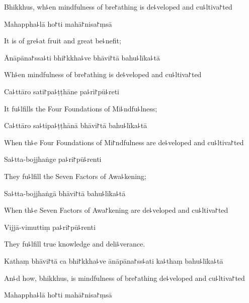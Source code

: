 \begin{english}
  Bhikkhus, wh꜕en mindfulness of bre꜓athing is de꜕veloped and cu꜕ltiva꜓ted
\end{english}

Mahappha꜕lā ho꜓ti mahā꜓nisa꜓ṃsā

\begin{english}
  It is of gre꜕at fruit and great be꜕nefit;
\end{english}

Ānāpāna꜓ssa꜕ti bhi꜓kkha꜕ve bhāvi꜓tā bahu꜕līka꜕tā

\begin{english}
  Wh꜕en mindfulness of bre꜓athing is de꜕veloped and cu꜕ltiva꜓ted
\end{english}

Ca꜕ttāro sati꜓pa꜕ṭṭhāne pa꜕ri꜓pū꜕reti

\begin{english}
  It fu꜕lfills the Four Foundations of Mi꜕ndfu꜕lness;
\end{english}

Ca꜕ttāro sa꜕tipa꜕ṭṭhānā bhāvi꜓tā bahu꜕līka꜕tā

\begin{english}
  When th꜕e Four Foundations of Mi꜓ndfulness are de꜕veloped and cu꜕ltiva꜓ted
\end{english}

Sa꜕tta-bojjhaṅge pa꜕ri꜓pū꜕renti

\begin{english}
  They fu꜕lfill the Seven Factors of Awa꜕kening;
\end{english}

Sa꜕tta-bojjhaṅgā bhāvi꜓tā bahu꜕līka꜕tā

\begin{english}
  When th꜕e Seven Factors of Awa꜓kening are de꜕veloped and cu꜕ltiva꜓ted
\end{english}

Vijjā-vimuttiṃ pa꜕ri꜓pū꜕renti

\begin{english}
  They fu꜕lfill true knowledge and deli꜕verance.
\end{english}

Kathaṃ bhāvi꜓tā ca bhi꜓kkha꜕ve ānāpāna꜓ss꜕ati ka꜕thaṃ bahu꜕līka꜕tā

\begin{english}
  An꜕d how, bhikkhus, is mindfulness of bre꜓athing de꜕veloped and cu꜕ltiva꜓ted
\end{english}

Mahappha꜕lā ho꜓ti mahā꜓nisa꜓ṃsā

